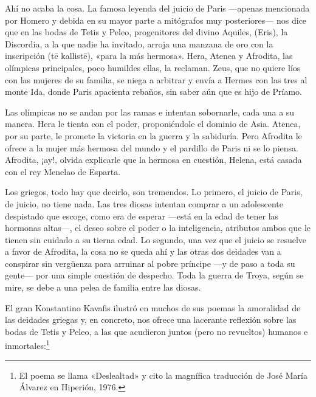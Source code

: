 Ahí no acaba la cosa. La famosa leyenda del juicio de Paris ---apenas mencionada por Homero y debida en su mayor parte a mitógrafos muy posteriores--- nos dice que
en las bodas de Tetis y Peleo, progenitores del divino Aquiles,  (Eris), la Discordia, a la que nadie ha invitado, arroja una manzana de oro con la inscripción  (tē kallistē), «para la más hermosa». Hera, Atenea y Afrodita, las olímpicas principales, poco humildes ellas, la reclaman. Zeus, que no quiere líos con las mujeres de su familia, se niega a arbitrar y envía a Hermes con las tres al monte Ida, donde Paris apacienta rebaños, sin saber aún que es hijo de Príamo.

Las olímpicas no se andan por las ramas e intentan sobornarle, cada una a su manera. Hera le tienta con el poder, proponiéndole el dominio de Asia. Atenea, por su parte, le promete la victoria en la guerra y la sabiduría. Pero Afrodita le ofrece a la mujer más hermosa del mundo y el pardillo de Paris ni se lo piensa. Afrodita, ¡ay!, olvida explicarle que la hermosa en cuestión, Helena, está casada con el rey Menelao de Esparta.

Los griegos, todo hay que decirlo, son tremendos. Lo primero, el juicio de Paris, de juicio, no tiene nada. Las tres diosas intentan comprar a un adolescente despistado que escoge, como era de esperar ---está en la edad de tener las hormonas altas---, el deseo sobre el poder o la inteligencia, atributos ambos que le tienen sin cuidado a su tierna edad. Lo segundo, una vez que el juicio se resuelve a favor de Afrodita, la cosa no se queda ahí y las otras dos deidades van a conspirar sin vergüenza para arruinar al pobre príncipe ---y de paso a toda su gente--- por una simple cuestión de despecho. Toda la guerra de Troya, según se mire, se debe a una pelea de familia entre las diosas.

El gran Konstantino Kavafis ilustró en muchos de sus poemas la amoralidad de las deidades griegas y, en concreto, nos ofrece una lacerante reflexión sobre las bodas de Tetis y Peleo, a las que acudieron juntos (pero no revueltos) humanos e inmortales:\footnote{El poema se llama «Deslealtad» y cito la magnífica traducción de José María Álvarez en Hiperión, 1976.}


